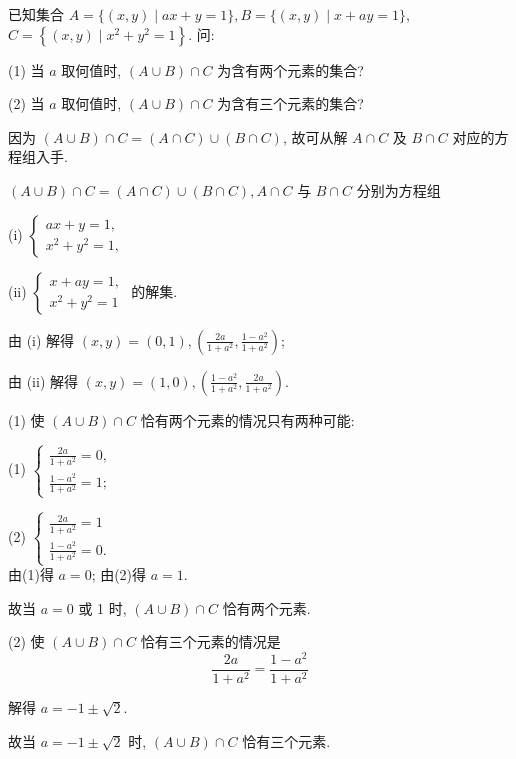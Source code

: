 \begin{example}
	已知集合 $A=\{(x, y) \mid a x+y=1\}, B=\{(x, y) \mid x+a y=1\}$, $C=\left\{(x, y) \mid x^{2}+y^{2}=1\right\}$. 问:

	(1) 当 $a$ 取何值时, $(A \cup B) \cap C$ 为含有两个元素的集合?

	(2) 当 $a$ 取何值时, $(A \cup B) \cap C$ 为含有三个元素的集合?

\end{example}

\begin{analysis}
	因为 $(A \cup B) \cap C=(A \cap C) \cup(B \cap C)$, 故可从解 $A \cap C$ 及 $B \cap C$ 对应的方程组入手.
\end{analysis}

\begin{solution}
	$(A \cup B) \cap C=(A \cap C) \cup(B \cap C), A \cap C$ 与 $B \cap C$ 分别为方程组

	(i) $\left\{\begin{array}{l}a x+y=1, \\ x^{2}+y^{2}=1,\end{array}\right.$

	(ii) $\left\{\begin{array}{l}x+a y=1, \\ x^{2}+y^{2}=1\end{array}\right.$
	的解集.

	由 (i) 解得 $(x, y)=(0,1),\left(\frac{2 a}{1+a^{2}}, \frac{1-a^{2}}{1+a^{2}}\right)$;

	由 (ii) 解得 $(x, y)=(1,0),\left(\frac{1-a^{2}}{1+a^{2}}, \frac{2 a}{1+a^{2}}\right)$.

	(1) 使 $(A \cup B) \cap C$ 恰有两个元素的情况只有两种可能:

	(1) $\left\{\begin{array}{l}\frac{2 a}{1+a^{2}}=0, \\ \frac{1-a^{2}}{1+a^{2}}=1 ;\end{array}\right.$

	(2) $\left\{\begin{array}{l}\frac{2 a}{1+a^{2}}=1 \\ \frac{1-a^{2}}{1+a^{2}}=0 .\end{array}\right.$\\
	由(1)得 $a=0$; 由(2)得 $a=1$.

	故当 $a=0$ 或 1 时, $(A \cup B) \cap C$ 恰有两个元素.

	(2) 使 $(A \cup B) \cap C$ 恰有三个元素的情况是
	$$
		\frac{2 a}{1+a^{2}}=\frac{1-a^{2}}{1+a^{2}}
	$$

	解得 $a=-1 \pm \sqrt{2}$.

	故当 $a=-1 \pm \sqrt{2}$ 时, $(A \cup B) \cap C$ 恰有三个元素.
\end{solution}

